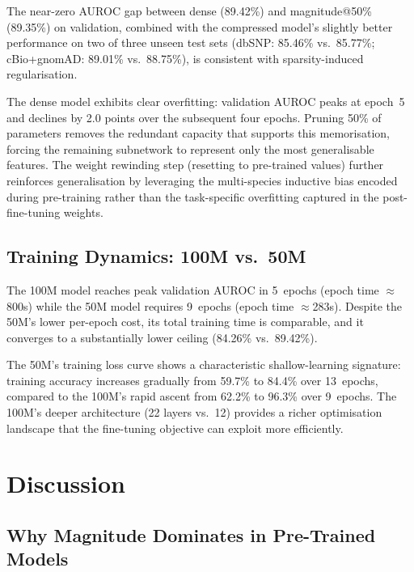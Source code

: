 \documentclass[journal]{IEEEtran}
\begin{document}
The near-zero AUROC gap between dense (89.42\%) and
magnitude@50\% (89.35\%) on validation, combined with the
compressed model's slightly better performance on
two of three unseen test sets (dbSNP: 85.46\% vs.\ 85.77\%;
cBio+gnomAD: 89.01\% vs.\ 88.75\%), is consistent with
sparsity-induced regularisation.

The dense model exhibits clear overfitting: validation AUROC
peaks at epoch~5 and declines by 2.0 points over the
subsequent four epochs.
Pruning 50\% of parameters removes the redundant capacity
that supports this memorisation, forcing the remaining
subnetwork to represent only the most generalisable features.
The weight rewinding step (resetting to pre-trained values)
further reinforces generalisation by leveraging the
multi-species inductive bias encoded during pre-training
rather than the task-specific overfitting captured in the
post-fine-tuning weights.

\subsection{Training Dynamics: 100M vs.\ 50M}

The 100M model reaches peak validation AUROC in 5~epochs
(epoch time $\approx$800s) while the 50M model requires
9~epochs (epoch time $\approx$283s).
Despite the 50M's lower per-epoch cost, its total training
time is comparable, and it converges to a substantially lower
ceiling (84.26\% vs.\ 89.42\%).

The 50M's training loss curve shows a characteristic
shallow-learning signature: training accuracy increases
gradually from 59.7\% to 84.4\% over 13~epochs, compared to
the 100M's rapid ascent from 62.2\% to 96.3\% over 9~epochs.
The 100M's deeper architecture (22 layers vs.\ 12) provides
a richer optimisation landscape that the fine-tuning
objective can exploit more efficiently.


\section{Discussion}
\label{sec:discussion}

\subsection{Why Magnitude Dominates in Pre-Trained Models}
\end{document}
